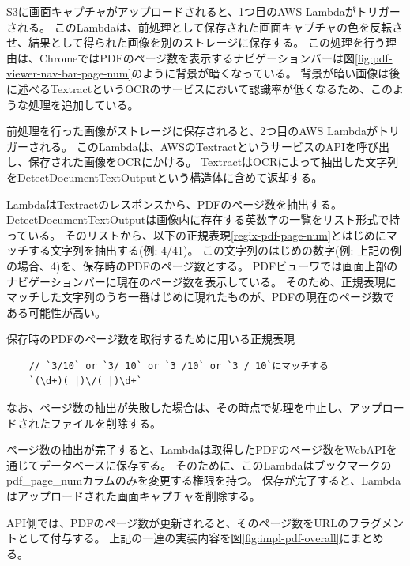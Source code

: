 S3に画面キャプチャがアップロードされると、1つ目のAWS Lambdaがトリガーされる。
このLambdaは、前処理として保存された画面キャプチャの色を反転させ、結果として得られた画像を別のストレージに保存する。
この処理を行う理由は、ChromeではPDFのページ数を表示するナビゲーションバーは図\ref{fig:pdf-viewer-nav-bar-page-num}のように背景が暗くなっている。
背景が暗い画像は後に述べるTextract\cite{textract}というOCRのサービスにおいて認識率が低くなるため、このような処理を追加している。

前処理を行った画像がストレージに保存されると、2つ目のAWS Lambdaがトリガーされる。
このLambdaは、AWSのTextractというサービスのAPIを呼び出し、保存された画像をOCRにかける。
TextractはOCRによって抽出した文字列をDetectDocumentTextOutput\cite{detect-document-text-output}という構造体に含めて返却する。

LambdaはTextractのレスポンスから、PDFのページ数を抽出する。
DetectDocumentTextOutputは画像内に存在する英数字の一覧をリスト形式で持っている。
そのリストから、以下の正規表現\ref{regix-pdf-page-num}とはじめにマッチする文字列を抽出する(例: 4/41)。
この文字列のはじめの数字(例: 上記の例の場合、4)を、保存時のPDFのページ数とする。
PDFビューワでは画面上部のナビゲーションバーに現在のページ数を表示している。
そのため、正規表現にマッチした文字列のうち一番はじめに現れたものが、PDFの現在のページ数である可能性が高い。

\begin{itembox}[l]{保存時のPDFのページ数を取得するために用いる正規表現}
  \label{regix-pdf-page-num}
  \begin{verbatim}
    // `3/10` or `3/ 10` or `3 /10` or `3 / 10`にマッチする
    `(\d+)( |)\/( |)\d+`
  \end{verbatim}
\end{itembox}

なお、ページ数の抽出が失敗した場合は、その時点で処理を中止し、アップロードされたファイルを削除する。

ページ数の抽出が完了すると、Lambdaは取得したPDFのページ数をWebAPIを通じてデータベースに保存する。
そのために、このLambdaはブックマークのpdf\_page\_numカラムのみを変更する権限を持つ。
保存が完了すると、Lambdaはアップロードされた画面キャプチャを削除する。

API側では、PDFのページ数が更新されると、そのページ数をURLのフラグメントとして付与する。
上記の一連の実装内容を図\ref{fig:impl-pdf-overall}にまとめる。

